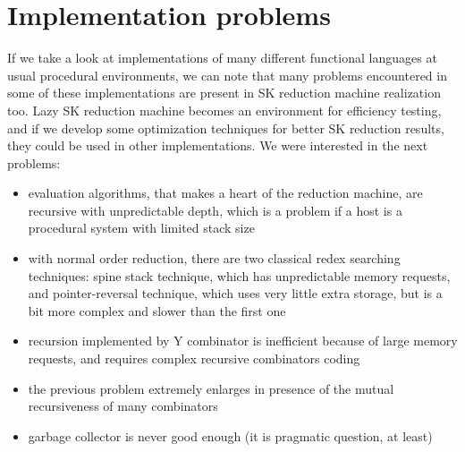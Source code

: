 \documentclass{article}
\begin{document}
\section{Implementation problems}
If we take a look at implementations of many different functional
languages at usual procedural environments, we can note that many
problems encountered in some of these implementations are present in
SK reduction machine realization too. Lazy SK reduction machine becomes
an environment for efficiency testing, and if we develop some
optimization techniques for better SK reduction results, they could be
used in other implementations. We were interested in the next problems:
\begin{itemize}
\item
evaluation algorithms, that makes a heart of the reduction machine,
are recursive with unpredictable depth, which is a problem if a host
is a procedural system with limited stack size
\item
with normal order reduction, there are two classical redex searching
techniques: spine stack technique, which has unpredictable memory
requests, and pointer-reversal technique, which uses very little extra
storage, but is a bit more complex and slower than the first one
\item
recursion implemented by Y combinator is inefficient because of large
memory requests, and requires complex recursive combinators coding
\item
the previous problem extremely enlarges in presence of the mutual
recursiveness of many combinators
\item
garbage collector is never good enough (it is pragmatic question,
at least)
\end{itemize}
\end{document}
